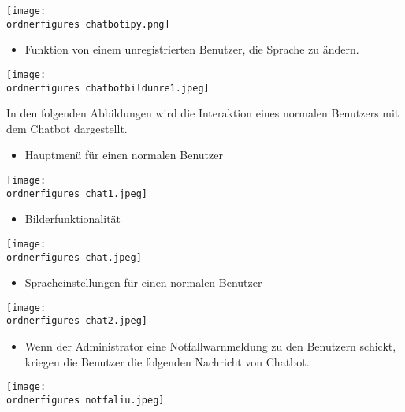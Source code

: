 \begin{center}
	\captionsetup{type=figure}
	\texttt{[image: \\ordnerfigures chatbotipy.png]}
	\caption{Keine Registrierung}
	\label{fig:chatffd3}
\end{center}
\begin{itemize}
	\item Funktion von einem unregistrierten Benutzer, die Sprache zu \"andern.
\end{itemize}
\begin{center}
	\captionsetup{type=figure}
	\texttt{[image: \\ordnerfigures chatbotbildunre1.jpeg]}
	\caption{Spracheinstellungen f\"ur unregistrierte Benutzer}
	\label{fig:chatfd3}
\end{center}
In den folgenden Abbildungen wird die Interaktion eines normalen Benutzers mit dem Chatbot dargestellt.
\begin{itemize}
	\item Hauptmen\"u f\"ur einen normalen Benutzer
\end{itemize}
\begin{center}
	\captionsetup{type=figure}
	\texttt{[image: \\ordnerfigures chat1.jpeg]}
	\caption{Hauptmen\"ur f\"ur einen normalen Benutzer} 
	\label{fig:chgtfd3}
\end{center}
\begin{itemize}
	\item Bilderfunktionalit\"at
\end{itemize}
\begin{center}
	\captionsetup{type=figure}
	\texttt{[image: \\ordnerfigures chat.jpeg]}
	\caption{Bilderfunktionalit\"at} 
	\label{fig:chgtf53}
\end{center}
\begin{itemize}
	\item Spracheinstellungen f\"ur einen normalen Benutzer
\end{itemize}
\begin{center}
	\captionsetup{type=figure}
	\texttt{[image: \\ordnerfigures chat2.jpeg]}
	\caption{Spracheinstellungen f\"ur einen normalen Benutzer} 
	\label{fig:chgtf43}
\end{center}
\begin{itemize}
	\item Wenn der Administrator eine Notfallwarnmeldung zu den Benutzern schickt, kriegen die Benutzer die folgenden Nachricht von Chatbot.
\end{itemize}
\begin{center}
	\captionsetup{type=figure}
	\texttt{[image: \\ordnerfigures notfaliu.jpeg]}
	\caption{Notfallwarmeldung vom Administrator} 
	\label{fig:chgf43}
\end{center}

